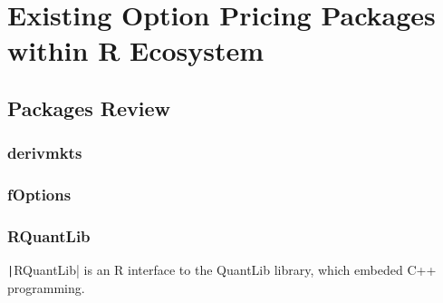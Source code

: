 \chapter{Existing Option Pricing Packages within R Ecosystem}

\section{Packages Review}

\subsection{derivmkts}

\subsection{fOptions}

\subsection{RQuantLib}

\texttt|RQuantLib| is an R interface to the QuantLib library, which embeded C++ programming.